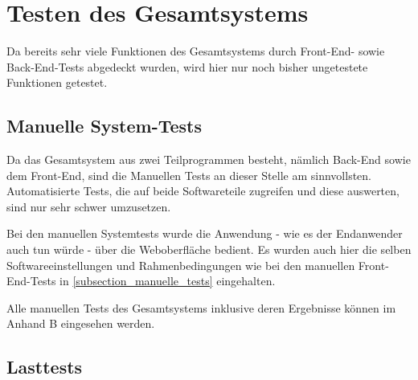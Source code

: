 \section{Testen des Gesamtsystems}
Da bereits sehr viele Funktionen des Gesamtsystems durch Front-End- sowie Back-End-Tests abgedeckt wurden, wird hier nur noch bisher ungetestete Funktionen getestet.

\subsection{Manuelle System-Tests}
Da das Gesamtsystem aus zwei Teilprogrammen besteht, nämlich Back-End sowie dem Front-End, sind die Manuellen Tests an dieser Stelle am sinnvollsten. Automatisierte Tests, die auf beide Softwareteile zugreifen und diese auswerten, sind nur sehr schwer umzusetzen. 

Bei den manuellen Systemtests wurde die Anwendung - wie es der Endanwender auch tun würde - über die Weboberfläche bedient. Es wurden auch hier die selben Softwareeinstellungen und Rahmenbedingungen wie bei den manuellen Front-End-Tests in \ref{subsection_manuelle_tests} eingehalten. 

\vspace{0.5cm}

Alle manuellen Tests des Gesamtsystems inklusive deren Ergebnisse können im Anhand B eingesehen werden.

\subsection{Lasttests}